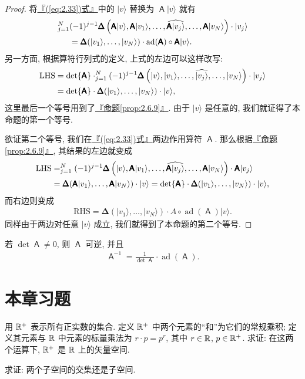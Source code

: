 \documentclass[lang=cn,zihao=-4,twoside,fontset=none]{textbook}
\let\sum\relax
\newcommand{\bsf}[1]{{\mathop{\pmb{\mathsf{#1}}}}}
\def\eq#1{\[\begin{aligned}{}#1\end{aligned}\]}
\newcommand{\qt}[1]{\left( #1 \right)}
\newcommand{\BDelta}{{\pmb{\Delta}}}
\renewcommand{\eqref}[1]{\hyperref[#1]{『\textnormal{(\ref*{#1})}式』}}
\newcommand{\propref}[1]{\hyperref[#1]{『命题\textnormal{\ref*{#1}}』}}
\newcommand{\vlist}[2]{\ket{#1_1},\dots,\ket{#1_{#2}}}
\DeclareMathOperator{\ad}{ad}
\renewcommand{\ket}[1]{| #1 \rangle}
\begin{document}
\begin{proof}
    将\eqref{eq:2.33}中的 $\ket{v}$ 替换为 $\bsf{A}\ket{v}$ 就有 
    \eq{
        \sum_{j=1}^N&(-1)^{j-1}\BDelta\qt{\bsf A\ket{v},\bsf{A}\ket{v_1},\dots,\widehat{\bsf{A}\ket{v_j}},\dots,\bsf{A}\ket{v_N}}\cdot\ket{v_j}\\
        &=\BDelta(\vlist{v}{N})\cdot\ad(\bsf{A})\circ\bsf A\ket{v}. 
    }
    另一方面, 根据算符行列式的定义, 上式的左边可以这样改写:
    \eq{
        \mathrm{LHS}&=\det\bsf{A}\cdot\sum_{j=1}^N(-1)^{j-1}\BDelta\qt{\ket{v},\ket{v_1},\dots,\widehat{\ket{v_j}},\dots,\ket{v_N}}\cdot\ket{v_j}\\
        &=\det\bsf{A}\cdot\BDelta(\vlist{v }{N})\cdot\ket{v},
    }
    这里最后一个等号用到了\propref{prop:2.6.9}. 由于 $\ket{v}$ 是任意的, 我们就证得了本命题的第一个等号. 

    欲证第二个等号, 我们在\eqref{eq:2.33}两边作用算符 $\bsf{A}$. 那么根据\propref{prop:2.6.9}, 其结果的左边就变成 
    \eq{
        \mathrm{LHS}&=\sum_{j=1}^N(-1)^{j-1}\BDelta\qt{\ket{v},\bsf{A}\ket{v_1},\dots,\widehat{\bsf{A}\ket{v_j}},\dots,\bsf{A}\ket{v_N}}\cdot\bsf{A}\ket{v_j}\\
        &=\BDelta(\bsf{A}\ket{v_1},\dots,\bsf{A}\ket{v_N})\cdot\ket{v}=\det\bsf{A}\cdot\BDelta(\vlist{v }{N})\cdot\ket{v},
    }
    而右边则变成 
    \eq{
        \mathrm{RHS}=\BDelta(\vlist{v }{N})\cdot A\circ\ad(\bsf{A})\ket{v}.
    }
    同样由于两边对任意 $\ket{v}$ 成立, 我们就得到了本命题的第二个等号.
\end{proof}

\begin{cor}
    \label{cor:2.6.13}%
    若 $\det\bsf{A}\neq 0$, 则 $\bsf{A}$ 可逆, 并且 
    \eq{
        \bsf{A}^{-1}=\frac{1}{\det\bsf{A}}\cdot\ad(\bsf{A}).
    }
\end{cor}

\newpage
\section{本章习题}\label{sec:2.7}

\begin{problem}
    \label{ex:2.1}%
    用 ${\mathbb R}^+$ 表示所有正实数的集合. 定义 ${\mathbb R}^+$ 中两个元素的``和''为它们的常规乘积; 定义其元素与 ${\mathbb R}$ 中元素的标量乘法为 $r\cdot p =p^r$, 其中 $r\in{\mathbb R}$, $p\in{\mathbb R}^+$. 求证: 在这两个运算下, ${\mathbb R}^+$ 是 ${\mathbb R}$ 上的矢量空间. 
\end{problem}

\begin{problem}
    \label{ex:2.2}%
    求证: 两个子空间的交集还是子空间.
\end{problem}
\end{document}

